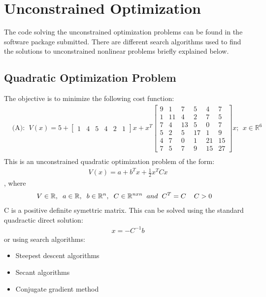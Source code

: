 \clearpage
\section{Unconstrained Optimization}
The code solving the unconstrained optimization problems can be found in the software package submitted.
There are different search algorithms used to find the solutions to unconstrained nonlinear problems briefly explained below. 

\subsection{Quadratic Optimization Problem}
The objective is to minimize the following cost function:
\begin{align}
& \mbox{(A)} : \ \ V(x) = 5+ \left[ \begin{array}{cccccc} 1 & 4 & 5 & 4 & 2 & 1 \end{array} \right] x + x^T \left[ \begin{array}{cccccc}  9 & 1 & 7 & 5 & 4 & 7 \\
1 & 11 & 4 & 2 & 7 & 5 \\ 7 & 4 & 13 & 5 & 0 & 7 \\ 5 & 2 & 5 & 17 & 1  & 9 \\
4 & 7 & 0 & 1 & 21 & 15 \\ 7 & 5 & 7 & 9 & 15 & 27 \end{array} \right] x ; \ \ x \in \mathbb{R}^6 \nonumber \\
\end{align}
This is an unconstrained quadratic optimization problem of the form:
\begin{align}
    V(x) = a + b^{T}x + \frac{1}{2}x^{T}Cx
\end{align},
where 
\begin{align}
    V \in \mathbb{R}, \hspace{2mm} a \in \mathbb{R}, \hspace{2mm} b \in \mathbb{R}^{n},\hspace{2mm} C \in \mathbb{R}^{nxn} \hspace{2mm} and \hspace{2mm} C^{T} = C  \hspace{2mm}& \hspace{2mm} C > 0
\end{align}
C is a positive definite symettric matrix.
This can be solved using the standard quadractic direct solution: 
\begin{align}
    x = -C^{-1}b
\end{align}
or using search algorithms: 
\begin{itemize}
    \item Steepest descent algorithms 
    \item Secant algorithms
    \item Conjugate gradient method 
\end{itemize}
